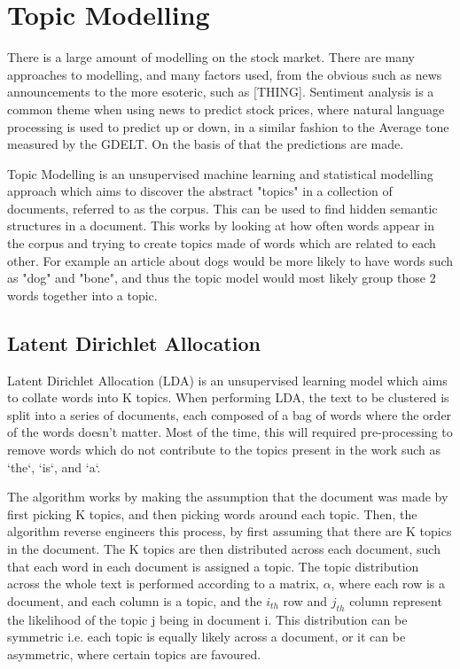 \section{Topic Modelling}

There is a large amount of modelling on the stock market. There are many approaches to modelling, and many factors used, from the obvious such as news announcements to the more esoteric, such as [THING]. Sentiment analysis is a common theme when using news to predict stock prices, where natural language processing is used to predict up or down, in a similar fashion to the Average tone measured by the GDELT. On the basis of that the predictions are made. 

Topic Modelling is an unsupervised machine learning and statistical modelling approach which aims to discover the abstract "topics" in a collection of documents, referred to as the corpus. This can be used to find hidden semantic structures in a document. This works by looking at how often words appear in the corpus and trying to create topics made of words which are related to each other. For example an article about dogs would be more likely to have words such as "dog" and "bone", and thus the topic model would most likely group those 2 words together into a topic. 


\subsection{Latent Dirichlet Allocation}
Latent Dirichlet Allocation (LDA) is an unsupervised learning model which aims to collate words into K topics. When performing LDA, the text to be clustered is split into a series of documents, each composed of a bag of words where the order of the words doesn't matter. Most of the time, this will required pre-processing to remove words which do not contribute to the topics present in the work such as `the`, `is`,  and `a`. 

\noindent The algorithm works by making the assumption that the document was made by first picking K topics, and then picking words around each topic. Then, the algorithm reverse engineers this process, by first assuming that there are K topics in the document. The K topics are then distributed across each document, such that each word in each document is assigned a topic. The topic distribution across the whole text is performed according to a matrix, $\alpha$,  where each row is a document, and each column is a topic, and the $i_{th}$ row and $j_{th}$ column represent the likelihood of the topic j being in document i. This distribution can be symmetric i.e. each topic is equally likely across a document, or it can be asymmetric, where certain topics are favoured.

